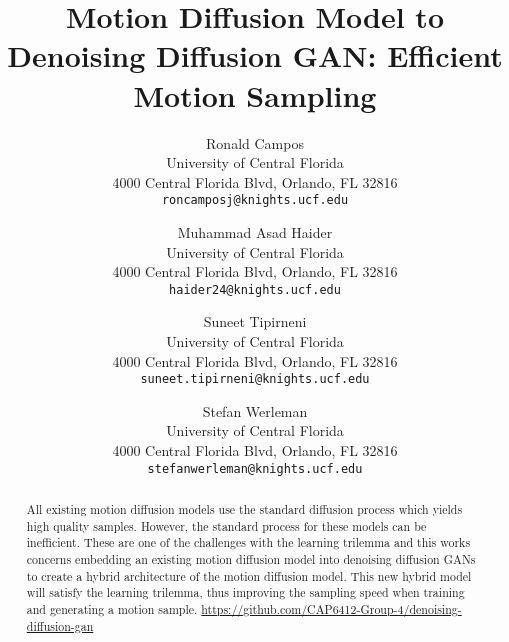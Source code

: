 \documentclass[10pt,twocolumn,letterpaper]{article}
\begin{document}
\title{Motion Diffusion Model to Denoising Diffusion GAN: Efficient Motion Sampling}

\author{
    Ronald Campos\\
    University of Central Florida\\
    4000 Central Florida Blvd, Orlando, FL 32816\\
    {\tt\small roncamposj@knights.ucf.edu}
    \and
    Muhammad Asad Haider\\
    University of Central Florida\\
    4000 Central Florida Blvd, Orlando, FL 32816\\
    {\tt\small haider24@knights.ucf.edu}
    \and
    Suneet Tipirneni\\
    University of Central Florida\\
    4000 Central Florida Blvd, Orlando, FL 32816\\
    {\tt\small suneet.tipirneni@knights.ucf.edu}
    \and
    Stefan Werleman\\
    University of Central Florida\\
    4000 Central Florida Blvd, Orlando, FL 32816\\
    {\tt\small stefanwerleman@knights.ucf.edu}
}


\maketitle

\begin{abstract}
    All existing motion diffusion models use the standard diffusion process which yields high 
    quality samples. However, the standard process for these models can be inefficient. These are one of
    the challenges with the learning trilemma and this works concerns embedding an existing motion diffusion 
    model into denoising diffusion GANs to create a hybrid architecture of the motion diffusion model. This 
    new hybrid model will satisfy the learning trilemma, thus improving the sampling speed when training and generating a motion sample.
    \url{https://github.com/CAP6412-Group-4/denoising-diffusion-gan}
\end{abstract}
\end{document}
